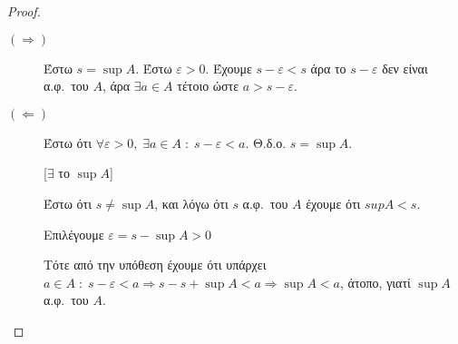 \documentclass[main.tex]{subfiles}
\begin{document}
\begin{proof}
\item {}
  \begin{description}
    \item[$ (\Rightarrow) $] 
      Έστω $ s = \sup A $. Έστω $ \varepsilon >0 $. Έχουμε $ 
      s - \varepsilon < s $ άρα το $ s- \varepsilon $ δεν είναι 
      α.φ.\ του $A$, άρα $ \exists a \in A $ τέτοιο ώστε $ 
      a > s- \varepsilon$. 

    \item [$ (\Leftarrow) $] 
      Έστω ότι $ \forall \varepsilon >0, \; \exists a \in A \; : 
      \; s- \varepsilon < a$. Θ.δ.ο. $ s = \sup A $. 


      \begin{minipage}{0.23\textwidth}
      \end{minipage}

      [$ \exists $ το $ \sup A $]

      Έστω ότι $ s \neq \sup A $, και λόγω ότι $ s $ α.φ.\ του $A$ 
      έχουμε ότι $sup A < s $. 

      Επιλέγουμε $ \varepsilon = s - \sup A > 0 $

      Τότε από την υπόθεση έχουμε ότι 
      υπάρχει $ a \in A \; : \; s - \varepsilon < a \Rightarrow s 
      - s + \sup A < a \Rightarrow \sup A < a $, άτοπο, γιατί 
      $ \sup A $ α.φ.\ του $A$.  
  \end{description} 
\end{proof}


\end{document}
